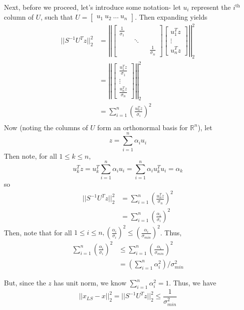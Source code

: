 \documentclass[paper=a4, fontsize=11pt]{scrartcl} %
\numberwithin{equation}{section} %
\numberwithin{figure}{section} %
\numberwithin{table}{section} %
\begin{document}
Next, before we proceed, let's introduce some notation- let $u_i$ represent the $i^{\text{th}}$ column of $U$, such that $U = \left[ \begin{matrix} u_1 \ u_2 \ \dots \ u_n \end{matrix} \right]$. Then expanding yields
\begin{align*}
||S^{-1}U^Tz ||_2^2 &=
\left|\left|
\left[\begin{matrix}
\frac{1}{\sigma_1} \ \qquad{} \ \qquad{}  \\
\qquad{} \ \ddots \ \qquad{} \\
\qquad{}  \ \qquad{}  \ \frac{1}{\sigma_n}
 \end{matrix}\right]
  \left[\begin{matrix}
u_1^T z  \\
\vdots \\
u_n^T z
\end{matrix}\right]
 \right|\right|_2^2 \\
 &=\left|\left|
 \left[\begin{matrix}
\frac{u_1^T z}{\sigma_1}  \\
\vdots \\
\frac{u_n^T z}{\sigma_n}
\end{matrix}\right]
 \right|\right|_2^2 \\
 &= \sum_{i=1}^n \left(\frac{u_n^T z}{\sigma_i}\right)^2 \\ 
\end{align*}
Now (noting the columns of $U$ form an orthonormal basis for $\mathbb{R}^n$), let
\[z = \sum_{i = 1}^{n}\alpha_i u_i\]
Then note, for all $1 \leq k \leq n$, 
\[u_k^T z = u_k^T \sum_{i = 1}^{n}\alpha_i u_i = \sum_{i = 1}^{n}\alpha_i u_k^T u_i = \alpha_k\]
so
\begin{align*}
 ||S^{-1}U^Tz ||_2^2 &= \sum_{i=1}^n \left(\frac{u_n^T z}{\sigma_n}\right)^2 \\ 
    &= \sum_{i=1}^n \left(\frac{\alpha_i}{\sigma_i}\right)^2
\end{align*}
Then, note that for all $1 \leq i \leq n, \left(\frac{\alpha_i}{\sigma_i}\right)^2 \leq \left(\frac{\alpha_i}{\sigma_{min}}\right)^2$. Thus, 
\begin{align*}
\sum_{i=1}^n \left(\frac{\alpha_i}{\sigma_i}\right)^2 &\leq \sum_{i=1}^n \left(\frac{\alpha_i}{\sigma_{min}}\right)^2 \\
   &= \left(\sum_{i=1}^n \alpha_i^2\right) / \sigma_{min}^2
\end{align*}

But, since the $z$ has unit norm, we know $\sum_{i=1}^n \alpha_i^2 = 1$. Thus, we have
\[||x_{LS} - x||_2^2 = ||S^{-1}U^Tz ||_2^2 \leq \frac{1}{\sigma_{min}^2}\]
\end{document}
